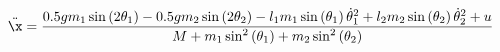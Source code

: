 \documentclass[preview]{standalone}
\begin{document}
\begin{align*}
\ddot{\x} = \frac{0.5 g m_{1} \operatorname{sin}\left(2\theta_{1}\right) - 0.5 g m_{2} \operatorname{sin}\left(2\theta_{2}\right) - l_{1} m_{1} \operatorname{sin}\left(\theta_{1}\right) \dot{\theta}_{1}^{2} + l_{2} m_{2} \operatorname{sin}\left(\theta_{2}\right) \dot{\theta}_{2}^{2} + u}{M + m_{1} \operatorname{sin}^{2}\left(\theta_{1}\right) + m_{2} \operatorname{sin}^{2}\left(\theta_{2}\right)}
\end{align*}
\end{document}
